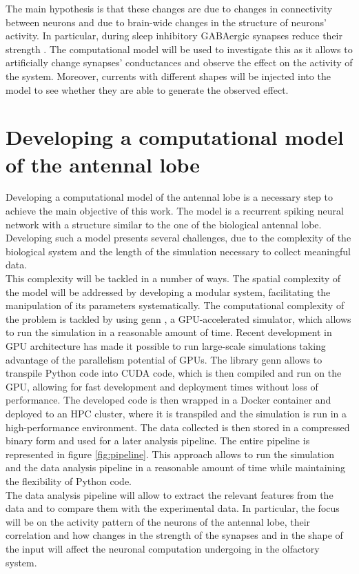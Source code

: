 The main hypothesis is that these changes are due to changes in connectivity between neurons and due to brain-wide changes in the structure of neurons' activity.
In particular, during sleep inhibitory GABAergic synapses reduce their strength \cite{gaba}.
The computational model will be used to investigate this as it allows to artificially change synapses' conductances and observe the effect on the activity of the system.
Moreover, currents with different shapes will be injected into the model to see whether they are able to generate the observed effect.

\section{Developing a computational model of the antennal lobe}
Developing a computational model of the antennal lobe is a necessary step to achieve the main objective of this work.
The model is a recurrent spiking neural network with a structure similar to the one of the biological antennal lobe.
Developing such a model presents several challenges, due to the complexity of the biological system and the length of the simulation necessary to collect meaningful data.\\
This complexity will be tackled in a number of ways.
The spatial complexity of the model will be addressed by developing a modular system, facilitating the manipulation of its parameters systematically.
The computational complexity of the problem is tackled by using genn \cite{genn}, a GPU-accelerated simulator, which allows to run the simulation in a reasonable amount of time.
Recent development in GPU architecture has made it possible to run large-scale simulations taking advantage of the parallelism potential of GPUs.
The library genn allows to transpile Python code into CUDA \cite{cuda} code, which is then compiled and run on the GPU, allowing for fast development and deployment times without loss of performance.
The developed code is then wrapped in a Docker container \cite{docker} and deployed to an HPC cluster, where it is transpiled and the simulation is run in a high-performance environment.
The data collected is then stored in a compressed binary form and used for a later analysis pipeline.
The entire pipeline is represented in figure \ref{fig:pipeline}.
This approach allows to run the simulation and the data analysis pipeline in a reasonable amount of time while maintaining the flexibility of Python code.\\
The data analysis pipeline will allow to extract the relevant features from the data and to compare them with the experimental data.
In particular, the focus will be on the activity pattern of the neurons of the antennal lobe, their correlation and how changes in the strength of the synapses and in the shape of the input will affect the neuronal computation undergoing in the olfactory system.


